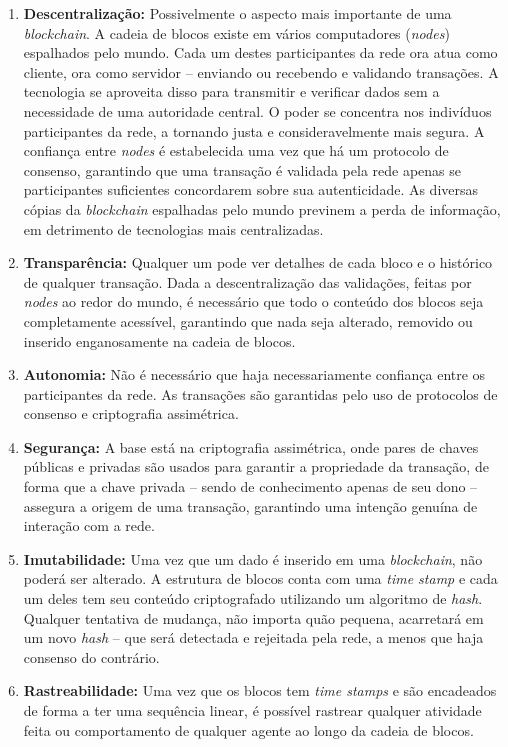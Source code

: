 {\begin{enumerate}
    \item \textbf{Descentralização:} Possivelmente o aspecto mais importante de uma \textit{blockchain}. A cadeia de blocos existe em vários computadores (\textit{nodes}) espalhados pelo mundo. Cada um destes participantes da rede ora atua como cliente, ora como servidor -- enviando ou recebendo e validando transações. A tecnologia se aproveita disso para transmitir e verificar dados sem a necessidade de uma autoridade central. O poder se concentra nos indivíduos participantes da rede, a tornando justa e consideravelmente mais segura. A confiança entre \textit{nodes} é estabelecida uma vez que há um protocolo de consenso, garantindo que uma transação é validada pela rede apenas se participantes suficientes concordarem sobre sua autenticidade. As diversas cópias da \textit{blockchain} espalhadas pelo mundo previnem a perda de informação, em detrimento de tecnologias mais centralizadas.
    \item \textbf{Transparência:} Qualquer um pode ver detalhes de cada bloco e o histórico de qualquer transação. Dada a descentralização das validações, feitas por \textit{nodes} ao redor do mundo, é necessário que todo o conteúdo dos blocos seja completamente acessível, garantindo que nada seja alterado, removido ou inserido enganosamente na cadeia de blocos.
    \item \textbf{Autonomia:} Não é necessário que haja necessariamente confiança entre os participantes da rede. As transações são garantidas pelo uso de protocolos de consenso e criptografia assimétrica.
    \item \textbf{Segurança:} A base está na criptografia assimétrica, onde pares de chaves públicas e privadas são usados para garantir a propriedade da transação, de forma que a chave privada -- sendo de conhecimento apenas de seu dono -- assegura a origem de uma transação, garantindo uma intenção genuína de interação com a rede.
    \item \textbf{Imutabilidade:} Uma vez que um dado é inserido em uma \textit{blockchain}, não poderá ser alterado. A estrutura de blocos conta com uma \textit{time stamp} e cada um deles tem seu conteúdo criptografado utilizando um algoritmo de \textit{hash}. Qualquer tentativa de mudança, não importa quão pequena, acarretará em um novo \textit{hash} -- que será detectada e rejeitada pela rede, a menos que haja consenso do contrário.
    \item \textbf{Rastreabilidade:} Uma vez que os blocos tem \textit{time stamps} e são encadeados de forma a ter uma sequência linear, é possível rastrear qualquer atividade feita ou comportamento de qualquer agente ao longo da cadeia de blocos.

\end{enumerate}}
